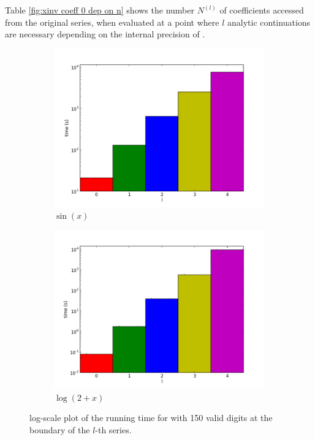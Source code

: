     Table \ref{fig:xinv coeff 0 dep on n} shows the number $N^{(l)}$ of
    coefficients accessed from the original series, when evaluated at a point
    where $l$ analytic continuations are necessary depending on the internal
    precision of \irram.

		\begin{figure}[h]
			\centering
			\begin{subfigure}{.45\textwidth}
				\includegraphics[width=1.0\textwidth]{img/analytic/sin_for_n_prec_150_dep_on_series_log.png}
				\caption{$\sin(x)$}
			\end{subfigure}
			\begin{subfigure}{.45\textwidth}
				\includegraphics[width=1.0\textwidth]{img/analytic/log_for_n_prec_150_dep_on_series_log.png}
				\caption{$\log(2+x)$}
			\end{subfigure}
			\caption{log-scale plot of the running time for \anarect with 150 valid digits at the boundary of the $l$-th series.}
			\label{fig:baana dep on series}
		\end{figure}
    
